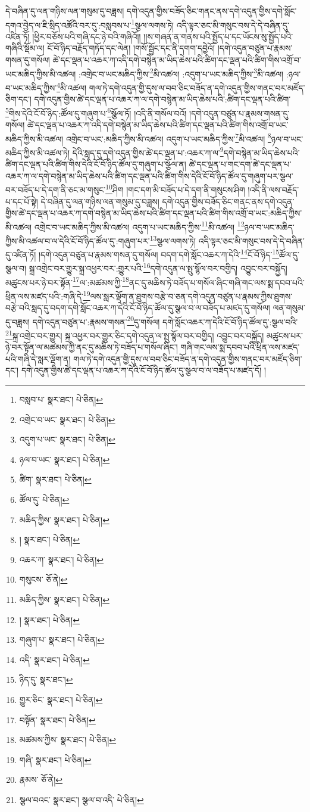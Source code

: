 དེ་བཞིན་དུ་ལན་གཉིས་ལན་གསུམ་དུ་བཟླས། དགེ་འདུན་གྱིས་བཟོད་ཅིང་གནང་ནས་དགེ་འདུན་གྱིས་དགེ་སློང་དགའ་བྱེད་ལ་ཇི་སྲིད་འཚོའི་བར་དུ་:བསླབས་པ་\footnote{བསླབ་པ་  སྣར་ཐང་།  པེ་ཅིན། }སྩལ་ལགས་ཏེ། འདི་ལྟར་ཅང་མི་གསུང་བས་དེ་དེ་བཞིན་དུ་འཛིན་ཏོ། །ཕྱིར་བཅོས་པའི་གཞི་དང་ཉེ་བའི་གཞིའོ།། །།ས་གཞན་ན་གནས་པའི་སྤྱོད་པ་དང་ཡོངས་སུ་སྤྱོད་པའི་གཞིའི་སྡོམ་ལ། ངོ་བོ་ཉིད་བརྗོད་གཏོད་དང་ལེན། །གསོ་སྦྱོང་དང་ནི་དགག་དབྱེའོ། །དགེ་འདུན་བཙུན་པ་རྣམས་གསན་དུ་གསོལ། ཚེ་དང་ལྡན་པ་འཆར་ཀ་འདི་དགེ་བསྙེན་མ་ཡིད་ཆེས་པའི་ཚིག་དང་ལྡན་པའི་ཚིག་གིས་འགྲོ་བ་ཡང་མཆིད་ཀྱིས་མི་འཚལ། :འགྲེང་བ་ཡང་མཆིད་ཀྱིས་\footnote{འགྲེང་བ་ཡང་  སྣར་ཐང་།  པེ་ཅིན། }མི་འཚལ། :འདུག་པ་ཡང་མཆིད་ཀྱིས་\footnote{འདུག་པ་ཡང་  སྣར་ཐང་།  པེ་ཅིན། }མི་འཚལ། :ཉལ་བ་ཡང་མཆིད་ཀྱིས་\footnote{ཉལ་བ་ཡང་  སྣར་ཐང་།  པེ་ཅིན། }མི་འཚལ། གལ་ཏེ་དགེ་འདུན་གྱི་དུས་ལ་བབ་ཅིང་བཟོད་ན་དགེ་འདུན་གྱིས་གནང་བར་མཛོད་ཅིག་དང་། དགེ་འདུན་གྱིས་ཚེ་དང་ལྡན་པ་འཆར་ཀ་ལ་དགེ་བསྙེན་མ་ཡིད་ཆེས་པའི་:ཚིག་དང་ལྡན་པའི་ཚིག་\footnote{ཚིག་  སྣར་ཐང་།  པེ་ཅིན། }གིས་དེའི་ངོ་བོ་ཉིད་:ཚོལ་དུ་གཞུག་པ་\footnote{ཚོལ་དུ་  པེ་ཅིན། }སྩོལ་ཏོ། །འདི་ནི་གསོལ་བའོ། །དགེ་འདུན་བཙུན་པ་རྣམས་གསན་དུ་གསོལ། ཚེ་དང་ལྡན་པ་འཆར་ཀ་འདི་དགེ་བསྙེན་མ་ཡིད་ཆེས་པའི་ཚིག་དང་ལྡན་པའི་ཚིག་གིས་འགྲོ་བ་ཡང་མཆིད་ཀྱིས་མི་འཚལ། འགྲེང་བ་ཡང་:མཆིད་ཀྱིས་མི་འཚལ། འདུག་པ་ཡང་མཆིད་ཀྱིས་\footnote{མཆིད་ཀྱིས་  སྣར་ཐང་།  པེ་ཅིན། }མི་འཚལ། \footnote{།    སྣར་ཐང་།  པེ་ཅིན། }ཉལ་བ་ཡང་མཆིད་ཀྱིས་མི་འཚལ་ཏེ། དེའི་སླད་དུ་དགེ་འདུན་གྱིས་ཚེ་དང་ལྡན་པ་:འཆར་ཀ་ལ་\footnote{འཆར་ཀ་  སྣར་ཐང་།  པེ་ཅིན། }དགེ་བསྙེན་མ་ཡིད་ཆེས་པའི་ཚིག་དང་ལྡན་པའི་ཚིག་གིས་དེའི་ངོ་བོ་ཉིད་ཚོལ་དུ་གཞུག་པ་སྩོལ་ན། ཚེ་དང་ལྡན་པ་གང་དག་ཚེ་དང་ལྡན་པ་འཆར་ཀ་ལ་དགེ་བསྙེན་མ་ཡིད་ཆེས་པའི་ཚིག་དང་ལྡན་པའི་ཚིག་གིས་དེའི་ངོ་བོ་ཉིད་ཚོལ་དུ་གཞུག་པར་སྩལ་བར་བཟོད་པ་དེ་དག་ནི་ཅང་མ་གསུང་\footnote{གསུངས་  ཅོ་ནེ། }ཤིག །གང་དག་མི་བཟོད་པ་དེ་དག་ནི་གསུངས་ཤིག །འདི་ནི་ལས་བརྗོད་པ་དང་པོ་སྟེ། དེ་བཞིན་དུ་ལན་གཉིས་ལན་གསུམ་དུ་བཟླས། དགེ་འདུན་གྱིས་བཟོད་ཅིང་གནང་ནས་དགེ་འདུན་གྱིས་ཚེ་དང་ལྡན་པ་འཆར་ཀ་དགེ་བསྙེན་མ་ཡིད་ཆེས་པའི་ཚིག་དང་ལྡན་པའི་ཚིག་གིས་འགྲོ་བ་ཡང་:མཆིད་ཀྱིས་མི་འཚལ། འགྲེང་བ་ཡང་མཆིད་ཀྱིས་མི་འཚལ། འདུག་པ་ཡང་མཆིད་ཀྱིས་\footnote{མཆིད་ཀྱིས་  སྣར་ཐང་།  པེ་ཅིན། }མི་འཚལ། \footnote{།    སྣར་ཐང་།  པེ་ཅིན། }ཉལ་བ་ཡང་མཆིད་ཀྱིས་མི་འཚལ་བ་ལ་དེའི་ངོ་བོ་ཉིད་ཚོལ་དུ་:གཞུག་པར་\footnote{གཞུག་པ་  སྣར་ཐང་།  པེ་ཅིན། }སྩལ་ལགས་ཏེ། འདི་ལྟར་ཅང་མི་གསུང་བས་དེ་དེ་བཞིན་དུ་འཛིན་ཏོ། །དགེ་འདུན་བཙུན་པ་རྣམས་གསན་དུ་གསོལ། བདག་དགེ་སློང་འཆར་ཀ་དེའི་\footnote{འདི་  སྣར་ཐང་།  པེ་ཅིན། }ངོ་བོ་ཉིད་\footnote{ཉིད་དུ་  སྣར་ཐང་། }ཚོལ་དུ་སྩལ་བ། སྐྲ་འགྲེང་བར་གྱུར་སྐྲ་འཕྱར་བར་:གྱུར་པའི་\footnote{གྱུར་ཅིང་  སྣར་ཐང་།  པེ་ཅིན། }དགེ་འདུན་ལ་སྤུ་སྙོལ་བར་བགྱིད། འབྱུང་བར་བསྐྱོད། མཚུངས་པར་ཉེ་བར་སྟོན་\footnote{བསྟོན་  སྣར་ཐང་།  པེ་ཅིན། }ལ་:མཚམས་ཀྱི་\footnote{མཚམས་ཀྱིས་  སྣར་ཐང་།  པེ་ཅིན། }ནང་དུ་མཆིས་ཏེ་བཟོད་པ་གསོལ་ཞིང་གཞི་གང་ལས་སྨ་དབབ་པའི་ཕྲིན་ལས་མཛད་པའི་:གཞི་དེ་\footnote{གཞི་  སྣར་ཐང་།  པེ་ཅིན། }ལས་སླར་ལྡོག་ན་ཐུགས་བརྩེ་བ་ཅན་དགེ་འདུན་བཙུན་པ་རྣམས་ཀྱིས་ཐུགས་བརྩེ་བའི་སླད་དུ་བདག་དགེ་སློང་འཆར་ཀ་དེའི་ངོ་བོ་ཉིད་ཚོལ་དུ་སྩལ་བ་ལ་བཟོད་པ་མཛད་དུ་གསོལ། ལན་གསུམ་དུ་བཟླས། དགེ་འདུན་བཙུན་པ་:རྣམས་གསན་\footnote{རྣམས་  ཅོ་ནེ། }དུ་གསོལ། དགེ་སློང་འཆར་ཀ་དེའི་ངོ་བོ་ཉིད་ཚོལ་དུ་:སྩལ་བའི་\footnote{སྩལ་བའང་  སྣར་ཐང་། སྩལ་བ་འདི་  པེ་ཅིན། }སྐྲ་འགྲེང་བར་གྱུར། སྐྲ་འཕྱར་བར་གྱུར་ཅིང་དགེ་འདུན་ལ་སྤུ་སྙོལ་བར་བགྱིད། འབྱུང་བར་བསྐྱོད། མཚུངས་པར་ཉེ་བར་སྟོན་ལ་མཚམས་ཀྱི་ནང་དུ་མཆིས་ཏེ་བཟོད་པ་གསོལ་ཞིང་། གཞི་གང་ལས་སྨ་དབབ་པའི་ཕྲིན་ལས་མཛད་པའི་གཞི་དེ་སླར་ལྡོག་ན། གལ་ཏེ་དགེ་འདུན་གྱི་དུས་ལ་བབ་ཅིང་བཟོད་ན་དགེ་འདུན་གྱིས་གནང་བར་མཛོད་ཅིག་དང་། དགེ་འདུན་གྱིས་ཚེ་དང་ལྡན་པ་འཆར་ཀ་དེའི་ངོ་བོ་ཉིད་ཚོལ་དུ་སྩལ་བ་ལ་བཟོད་པ་མཛད་དོ། །
